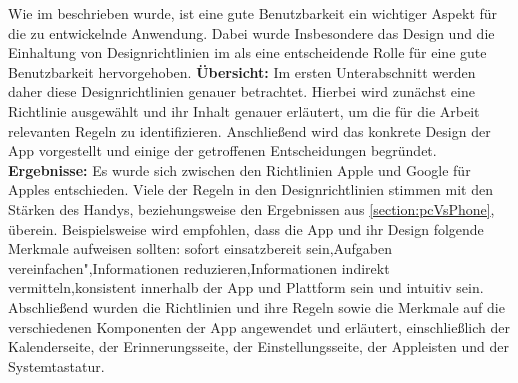 
Wie im  beschrieben wurde, ist eine gute Benutzbarkeit ein wichtiger Aspekt für die zu entwickelnde Anwendung. Dabei wurde Insbesondere das Design und die Einhaltung von Designrichtlinien im  als eine entscheidende Rolle für eine gute Benutzbarkeit hervorgehoben.\newline%
\textbf{Übersicht:} %
	Im ersten Unterabschnitt werden daher diese Designrichtlinien genauer betrachtet. Hierbei wird zunächst eine Richtlinie ausgewählt und ihr Inhalt genauer erläutert, um die für die Arbeit relevanten Regeln zu identifizieren.  %
	Anschließend wird das konkrete Design der App vorgestellt und einige der getroffenen Entscheidungen begründet.\newline%
\textbf{Ergebnisse:}\myTodo
Es wurde sich zwischen den Richtlinien Apple und Google für Apples entschieden.
Viele der Regeln in den Designrichtlinien stimmen mit den Stärken des Handys, beziehungsweise den Ergebnissen aus \ref{section:pcVsPhone}, überein. Beispielsweise wird empfohlen, dass die App und ihr Design folgende Merkmale aufweisen sollten: \glqq sofort einsatzbereit sein\grqq{},\glqq Aufgaben vereinfachen",\glqq Informationen reduzieren\grqq{},\glqq Informationen indirekt vermitteln\grqq{},\glqq konsistent innerhalb der App und Plattform sein\grqq{} und \glqq intuitiv sein\grqq{}.
Abschließend wurden die Richtlinien und ihre Regeln sowie die Merkmale auf die verschiedenen Komponenten der App angewendet und erläutert, einschließlich der Kalenderseite, der Erinnerungsseite, der Einstellungsseite, der Appleisten und der Systemtastatur.%
%
%
%
%
%
%
